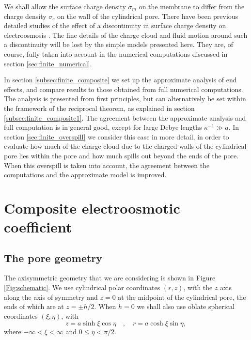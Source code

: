 We shall allow the surface charge density $\sigma_m$ on the membrane to differ from the charge density $\sigma_c$ on the wall of the cylindrical pore. There have been previous detailed studies of the effect of a discontinuity in surface charge density on electroosmosis \cite{yariv2004,khair2008}. The fine details of the charge cloud and fluid motion around such a discontinuity will be lost by the simple models presented here. They are, of course, fully taken into account in the numerical computations discussed in section \ref{sec:finite_numerical}.

In section \ref{subsec:finite_composite} we set up the approximate analysis of end effects, and compare results to those obtained from full numerical computations. The analysis is presented from first principles, but can alternatively be set within the framework of the reciprocal theorem, as explained in section \ref{subsec:finite_composite1}. The agreement between the approximate analysis and full computation is in general good, except for large Debye lengths $\kappa^{-1}\gg a$. In section \ref{sec:finite_overspill} we consider this case in more detail, in order to evaluate how much of the charge cloud due to the charged walls of the cylindrical pore lies within the pore and how much spills out beyond the ends of the pore. When this overspill is taken into account, the agreement between the computations and the approximate model is improved.

\section{Composite electroosmotic coefficient}
\subsection{The pore geometry}
The axisymmetric geometry that we are considering is shown in Figure \ref{Fig:schematic}. We use cylindrical polar coordinates $(r,z)$, with the $z$ axis along the axis of symmetry and $z=0$ at the midpoint of the cylindrical pore, the ends of which are at $z=\pm h/2$. When $h=0$ we shall also use oblate spherical coordinates $(\xi,\eta)$, with
\begin{equation}
z=a\sinh\xi\cos\eta\quad,\quad r=a\cosh\xi\sin\eta,
\end{equation}
where $-\infty<\xi<\infty$ and $0\le \eta<\pi/2$.

